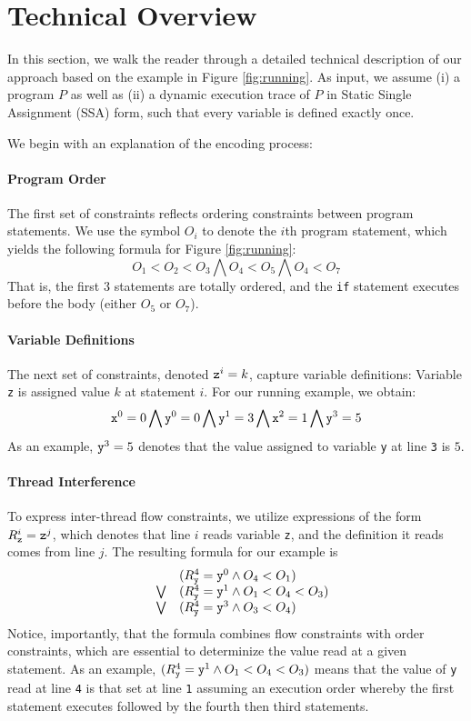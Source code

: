 \section{Technical Overview}\label{Se:techoverview}

In this section, we walk the reader through a detailed technical description of our approach based on the example in Figure \ref{fig:running}. 
%
As input, we assume (i) a program $P$ as well as (ii) a dynamic execution trace of $P$ in Static Single Assignment (SSA) form, such that every variable is defined exactly once.

We begin with an explanation of the encoding process:

\paragraph{Program Order} The first set of constraints reflects ordering constraints between program statements. We use the symbol $O_i$ to denote the $i$th program statement, which yields the following formula for Figure \ref{fig:running}:
$$
	O_1 < O_2 < O_3 \bigwedge O_4 < O_5 \bigwedge O_4 < O_7
$$
That is, the first 3 statements are totally ordered, and the {\tt if} statement executes before the body (either $O_5$ or $O_7$).

\paragraph{Variable Definitions} The next set of constraints, denoted ${\tt z}^i=k$, capture variable definitions: Variable {\tt z} is assigned value $k$ at statement $i$. For our running example, we obtain:
$$
	{\tt x}^0 = 0 \bigwedge {\tt y}^0 = 0 \bigwedge {\tt y}^1 = 3 \bigwedge 
			{\tt x}^2 = 1 \bigwedge {\tt y}^3 = 5
$$
As an example, ${\tt y}^3 = 5$ denotes that the value assigned to variable {\tt y} 
at line {\tt 3} is $5$.

\paragraph{Thread Interference} To express inter-thread flow constraints, we utilize expressions of the form $R_{\tt z}^i={\tt z}^j$, which denotes that line $i$ reads variable {\tt z}, and the definition it reads comes from line $j$. The resulting formula for our example is
$$
\begin{array}{lcl}
	& & (R_{\tt y}^4={\tt y}^0 \wedge O_4 < O_1)  \\
& \bigvee &
	(R_{\tt y}^4={\tt y}^1 \wedge O_1 < O_4 < O_3) \\
& \bigvee &
	(R_{\tt y}^4={\tt y}^3 \wedge O_3 < O_4)
\end{array}
$$    
Notice, importantly, that the formula combines flow constraints with order constraints, which are essential to determinize the value read at a given statement. As an example, 
$(R_{\tt y}^4={\tt y}^1 \wedge O_1 < O_4 < O_3)$ means that the value of {\tt y} read at 
line {\tt 4} is that set at line {\tt 1} assuming an execution order whereby the first statement executes followed by the fourth then third statements. 

